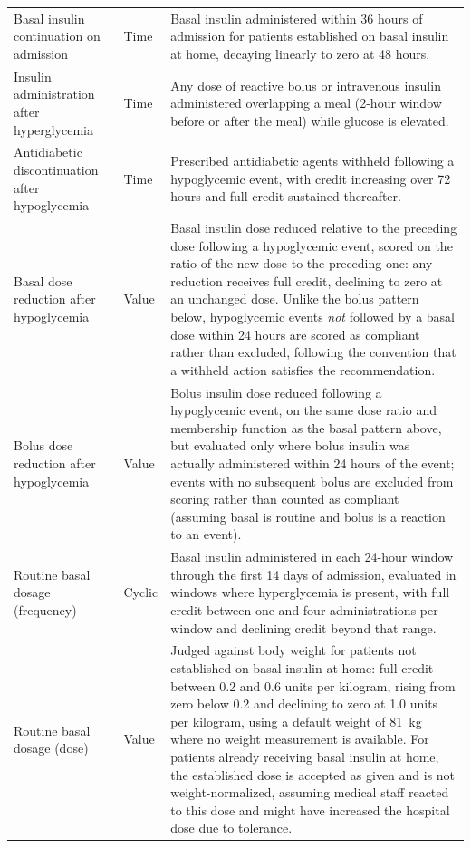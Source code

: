 \begin{table}[t]
\begin{tabularx}{\textwidth}{
>{\raggedright\arraybackslash}p{}
l
>{\raggedright\arraybackslash}X
}
Basal insulin continuation on admission & Time &
Basal insulin administered within 36 hours of admission for patients
established on basal insulin at home, decaying linearly to zero at 48
hours. \\

Insulin administration after hyperglycemia & Time &
Any dose of reactive bolus or intravenous insulin administered overlapping a
meal (2-hour window before or after the meal) while glucose is elevated. \\

Antidiabetic discontinuation after hypoglycemia & Time &
Prescribed antidiabetic agents withheld following a hypoglycemic event,
with credit increasing over 72 hours and full credit sustained
thereafter. \\

Basal dose reduction after hypoglycemia & Value &
Basal insulin dose reduced relative to the preceding dose following a
hypoglycemic event, scored on the ratio of the new dose to the preceding
one: any reduction receives full credit, declining to zero at an unchanged
dose. Unlike the bolus pattern below, hypoglycemic events \emph{not}
followed by a basal dose within 24 hours are scored as compliant rather than
excluded, following the convention that a withheld action satisfies the
recommendation. \\

Bolus dose reduction after hypoglycemia & Value &
Bolus insulin dose reduced following a hypoglycemic event, on the same dose
ratio and membership function as the basal pattern above, but evaluated only
where bolus insulin was actually administered within 24 hours of the event;
events with no subsequent bolus are excluded from scoring rather than
counted as compliant (assuming basal is routine and bolus is a reaction to
an event). \\

Routine basal dosage (frequency) & Cyclic &
Basal insulin administered in each 24-hour window through the first 14 days
of admission, evaluated in windows where hyperglycemia is present, with full
credit between one and four administrations per window and declining credit
beyond that range. \\

Routine basal dosage (dose) & Value &
Judged against body weight for patients not established on basal insulin at
home: full credit between 0.2 and 0.6 units per kilogram, rising from zero
below 0.2 and declining to zero at 1.0 units per kilogram, using a default
weight of 81~kg where no weight measurement is available. For patients
already receiving basal insulin at home, the established dose is accepted as
given and is not weight-normalized, assuming medical staff reacted to this
dose and might have increased the hospital dose due to tolerance. \\

\bottomrule
\end{tabularx}
\end{table}
